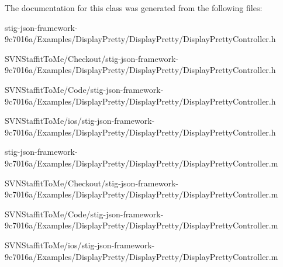 \-The documentation for this class was generated from the following files\-:\begin{DoxyCompactItemize}
\item 
stig-\/json-\/framework-\/9c7016a/\-Examples/\-Display\-Pretty/\-Display\-Pretty/\-Display\-Pretty\-Controller.\-h\item 
\-S\-V\-N\-Staffit\-To\-Me/\-Checkout/stig-\/json-\/framework-\/9c7016a/\-Examples/\-Display\-Pretty/\-Display\-Pretty/\-Display\-Pretty\-Controller.\-h\item 
\-S\-V\-N\-Staffit\-To\-Me/\-Code/stig-\/json-\/framework-\/9c7016a/\-Examples/\-Display\-Pretty/\-Display\-Pretty/\-Display\-Pretty\-Controller.\-h\item 
\-S\-V\-N\-Staffit\-To\-Me/ios/stig-\/json-\/framework-\/9c7016a/\-Examples/\-Display\-Pretty/\-Display\-Pretty/\-Display\-Pretty\-Controller.\-h\item 
stig-\/json-\/framework-\/9c7016a/\-Examples/\-Display\-Pretty/\-Display\-Pretty/\-Display\-Pretty\-Controller.\-m\item 
\-S\-V\-N\-Staffit\-To\-Me/\-Checkout/stig-\/json-\/framework-\/9c7016a/\-Examples/\-Display\-Pretty/\-Display\-Pretty/\-Display\-Pretty\-Controller.\-m\item 
\-S\-V\-N\-Staffit\-To\-Me/\-Code/stig-\/json-\/framework-\/9c7016a/\-Examples/\-Display\-Pretty/\-Display\-Pretty/\-Display\-Pretty\-Controller.\-m\item 
\-S\-V\-N\-Staffit\-To\-Me/ios/stig-\/json-\/framework-\/9c7016a/\-Examples/\-Display\-Pretty/\-Display\-Pretty/\-Display\-Pretty\-Controller.\-m\end{DoxyCompactItemize}
